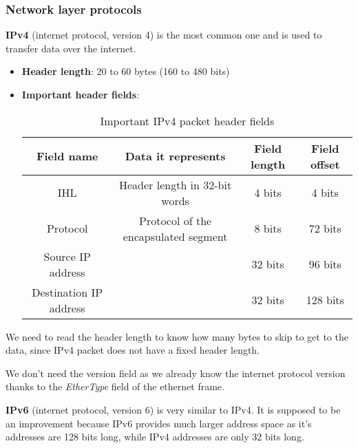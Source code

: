 \documentclass[a4paper]{article}
\begin{document}
  \vspace{1cm}


  \subsubsection{Network layer protocols}

  \textbf{IPv4} (internet protocol, version 4) is the most common one and is 
  used to transfer data over the internet.
  \begin{itemize}
    \item \textbf{Header length}: 20 to 60 bytes (160 to 480 bits)
    \item \textbf{Important header fields}:
      \begin{table}[h]
        \centering
        \begin{tabular}{|c|c|c|c|}
          \hline
          Field name & Data it represents & Field length & Field offset \\
          \hline
          \hline
          IHL & Header length in 32-bit words & 4 bits & 4 bits \\
          \hline
          Protocol & Protocol of the encapsulated segment & 8 bits & 72 bits \\
          \hline
          Source IP address & & 32 bits & 96 bits \\
          \hline
          Destination IP address & & 32 bits & 128 bits \\
          \hline
        \end{tabular}
        \caption{Important IPv4 packet header fields}
      \end{table}
  \end{itemize}
  We need to read the header length to know how many bytes to skip to get to 
  the data, since IPv4 packet does not have a fixed header length.
  \begin{notes}
    \item We don't need the version field as we already know the internet 
      protocol version thanks to the \textit{EtherType} field of the ethernet 
      frame.
  \end{notes}

  \vspace{1cm}


  \textbf{IPv6} (internet protocol, version 6) is very similar to IPv4. It is
  supposed to be an improvement because IPv6 provides much larger
  address space as it's addresses are 128 bits long, while IPv4 addresses 
  are only 32 bits long.
\end{document}
